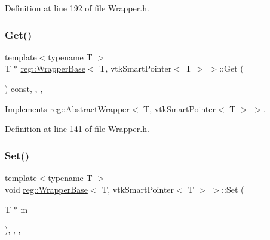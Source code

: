Definition at line 192 of file Wrapper.\+h.

\mbox{\label{structreg_1_1_wrapper_base_3_01_t_00_01vtk_smart_pointer_3_01_t_01_4_01_4_a61bd745924ef0582ee61ae174ed7479f}} 
\subsubsection{\texorpdfstring{Get()}{Get()}}
{\footnotesize\ttfamily template$<$typename T $>$ \\
T $\ast$ \hyperlink{structreg_1_1_wrapper_base}{reg\+::\+Wrapper\+Base}$<$ T, vtk\+Smart\+Pointer$<$ T $>$ $>$\+::Get (\begin{DoxyParamCaption}{ }\end{DoxyParamCaption}) const\hspace{0.3cm}{\ttfamily [inline]}, {\ttfamily [override]}, {\ttfamily [virtual]}, {\ttfamily [noexcept]}}



Implements \hyperlink{structreg_1_1_abstract_wrapper_a88e7079432573b09a5cd695be34e9147}{reg\+::\+Abstract\+Wrapper$<$ T, vtk\+Smart\+Pointer$<$ T $>$ $>$}.



Definition at line 141 of file Wrapper.\+h.

\mbox{\label{structreg_1_1_wrapper_base_3_01_t_00_01vtk_smart_pointer_3_01_t_01_4_01_4_aa066a74ca5abf0e13fd3ed62f0508e32}} 
\subsubsection{\texorpdfstring{Set()}{Set()}}
{\footnotesize\ttfamily template$<$typename T $>$ \\
void \hyperlink{structreg_1_1_wrapper_base}{reg\+::\+Wrapper\+Base}$<$ T, vtk\+Smart\+Pointer$<$ T $>$ $>$\+::Set (\begin{DoxyParamCaption}\item[{T $\ast$}]{m }\end{DoxyParamCaption})\hspace{0.3cm}{\ttfamily [inline]}, {\ttfamily [override]}, {\ttfamily [virtual]}, {\ttfamily [noexcept]}}



